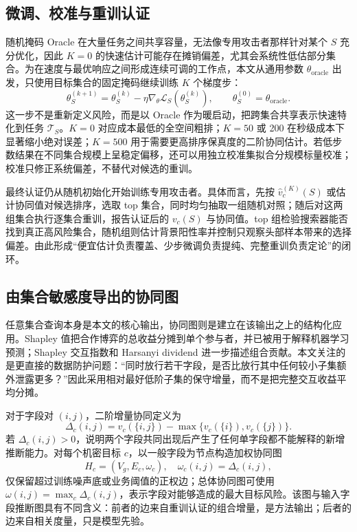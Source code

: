 \documentclass[UTF8,a4paper,zihao=5,fontset=fandol]{ctexart}
\begin{document}
\subsection{微调、校准与重训认证}

随机掩码 Oracle 在大量任务之间共享容量，无法像专用攻击者那样针对某个 $S$ 充分优化，因此 $K=0$ 的快速估计可能存在摊销偏差，尤其会系统性低估部分集合。为在速度与最优响应之间形成连续可调的工作点，本文从通用参数 $\theta_{\mathrm{oracle}}$ 出发，只使用目标集合的固定掩码继续训练 $K$ 个梯度步：
\begin{equation}
  \theta_{S}^{(k+1)}
  =\theta_S^{(k)}-\eta\nabla_{\theta}
  \mathcal L_S(\theta_S^{(k)}),\qquad
  \theta_S^{(0)}=\theta_{\mathrm{oracle}}.
  \label{eq:finetune}
\end{equation}
这一步不是重新定义风险，而是以 Oracle 作为暖启动，把跨集合共享表示快速特化到任务 $\mathcal T_S$。$K=0$ 对应成本最低的全空间粗排；$K=50$ 或 200 在秒级成本下显著缩小绝对误差；$K=500$ 用于需要更高排序保真度的二阶协同估计。若低步数结果在不同集合规模上呈稳定偏移，还可以用独立校准集拟合分规模标量校准；校准只修正系统偏差，不替代对候选的重训。

最终认证仍从随机初始化开始训练专用攻击者。具体而言，先按 $\widehat v_c^{(K)}(S)$ 或估计协同值对候选排序，选取 top 集合，同时均匀抽取一组随机对照；随后对这两组集合执行逐集合重训，报告认证后的 $v_c(S)$ 与协同值。top 组检验搜索器能否找到真正高风险集合，随机组则估计背景阳性率并控制只观察头部样本带来的选择偏差。由此形成“便宜估计负责覆盖、少步微调负责提纯、完整重训负责定论”的闭环。

\subsection{由集合敏感度导出的协同图}

任意集合查询本身是本文的核心输出，协同图则是建立在该输出之上的结构化应用。Shapley 值把合作博弈的总收益分摊到单个参与者\citep{shapley1953value}，并已被用于解释机器学习预测\citep{lundberg2017shap}；Shapley 交互指数和 Harsanyi dividend 进一步描述组合贡献\citep{harsanyi1963bargaining,grabisch1999interaction}。本文关注的是更直接的数据防护问题：“同时放行若干字段，是否比放行其中任何较小子集额外泄露更多？”因此采用相对最好低阶子集的保守增量，而不是把完整交互收益平均分摊。

对于字段对 $(i,j)$，二阶增量协同定义为
\begin{equation}
  \Delta_c(i,j)=v_c(\{i,j\})
  -\max\{v_c(\{i\}),v_c(\{j\})\}.
  \label{eq:pair}
\end{equation}
若 $\Delta_c(i,j)>0$，说明两个字段共同出现后产生了任何单字段都不能解释的新增推断能力。对每个机密目标 $c$，以一般字段为节点构造加权协同图
\begin{equation}
  H_c=(V_g,E_c,\omega_c),\quad
  \omega_c(i,j)=\Delta_c(i,j),
\end{equation}
仅保留超过训练噪声底或业务阈值的正权边；总体协同图可使用 $\omega(i,j)=\max_c\Delta_c(i,j)$，表示字段对能够造成的最大目标风险。该图与输入字段推断图具有不同含义：前者的边来自重训认证的组合增量，是方法输出；后者的边来自相关度量，只是模型先验。
\end{document}
